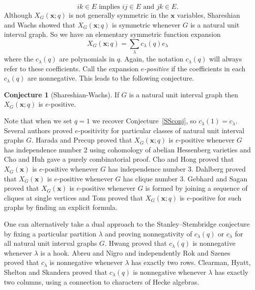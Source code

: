 \documentclass[10pt,a4paper]{amsart}
\theoremstyle{definition}
\newtheorem{conjecture}[theorem]{Conjecture}
\theoremstyle{remark}
\numberwithin{equation}{section}
\newcommand{\la}{\lambda}
\begin{document}
\begin{equation}\label{eq:uicondition}
ik\in E \text{ implies } ij\in E \text{ and } jk\in E.
\end{equation}
Although $X_G(\bm x;q)$ is not generally symmetric in the $\bm x$ variables, Shareshian and Wachs \cite[Theorem 4.5]{chromposquasi} showed that $X_G(\bm x;q)$ is symmetric whenever $G$ is a natural unit interval graph. 
So we have an elementary symmetric function expansion
\begin{equation}
\label{c_la(q)}
X_G(\bm x;q)=\sum_\lambda c_\lambda(q)e_\lambda
\end{equation}
where the $c_\la(q)$ are polynomials in $q$.  
Again, the notation $c_\la(q)$ will always refer to these coefficients.
Call the expansion {\em $e$-positive} if the coefficients in each $c_\la(q)$ are nonnegative.
This leads to the following conjecture.
\begin{conjecture}[Shareshian-Wachs]
\label{SWconj}
 If $G$ is a natural unit interval graph
 then $X_G(\bm x;q)$ is $e$-positive.
\end{conjecture}
Note that when we set $q=1$ we recover Conjecture~\ref{SSconj}, so $c_\lambda(1)=c_\lambda$.
Several authors proved $e$-positivity for particular classes of natural unit interval graphs $G$. Harada and Precup \cite[Theorem 6.1]{stanstemhess} proved that $X_G(\bm x;q)$ is $e$-positive whenever $G$ has independence number $2$ using cohomology of abelian Hessenberg varieties and Cho and Huh \cite[Theorem 3.3]{chromstoe} gave a purely combinatorial proof. Cho and Hong \cite[Theorem 1.8]{chrombounce3} proved that $X_G(\bm x)$ is $e$-positive whenever $G$ has independence number $3$. Dahlberg \cite[Corollary 5.4]{trilad} proved that $X_G(\bm x)$ is $e$-positive whenever $G$ has clique number $3$. Gebhard and Sagan \cite[Corollary 7.7]{chromnsym} proved that $X_G(\bm x)$ is $e$-positive whenever $G$ is formed by joining a sequence of cliques at single vertices and Tom \cite[Corollary 4.20]{qforesttriples} proved that $X_G(\bm x;q)$ is $e$-positive for such graphs by finding an explicit formula. 

One can alternatively take a dual approach to the Stanley--Stembridge conjecture by fixing a particular partition $\lambda$ and proving nonnegativity of $c_\lambda(q)$ or $c_\lambda$ for all natural unit interval graphs $G$. Hwang \cite[Theorem 5.13]{chromtwoparthook} proved that $c_\lambda(q)$ is nonnegative whenever $\lambda$ is a hook. Abreu and Nigro \cite[Corollary 1.10]{chromhesssplitting} and independently Rok and Szenes \cite[Theorem 4.1]{chromeschers} proved that $c_\lambda$ is nonnegative whenever $\lambda$ has exactly two rows. Clearman, Hyatt, Shelton and Skandera \cite[Theorem 10.3]{chromhecke} proved that $c_\lambda(q)$ is nonnegative whenever $\lambda$ has exactly two columns, using a connection to characters of Hecke algebras. 
\end{document}

